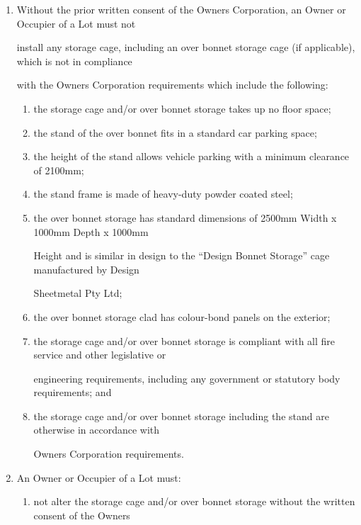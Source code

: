 \documentclass{article}
\begin{document}
\begin{enumerate}[label=\arabic*.]
\begin{enumerate}[label=\arabic{enumi}.\arabic*.]
\begin{enumerate}[label=(\arabic*)]
\item  Without the prior written consent of the Owners Corporation, an Owner or Occupier of a Lot must not 

install any storage cage, including an over bonnet storage cage (if applicable), which is not in compliance 

with the Owners Corporation requirements which include the following: 

\begin{enumerate}[label=(\alph*)]
\item  the storage cage and/or over bonnet storage takes up no floor space; 

\item  the stand of the over bonnet fits in a standard car parking space; 

\item  the height of the stand allows vehicle parking with a minimum clearance of 2100mm; 

\item  the stand frame is made of heavy-duty powder coated steel; 

\item  the over bonnet storage has standard dimensions of 2500mm Width x 1000mm Depth x 1000mm 

Height and is similar in design to the “Design Bonnet Storage” cage manufactured by Design 

Sheetmetal Pty Ltd; 

\item  the over bonnet storage clad has colour-bond panels on the exterior; 

\item  the storage cage and/or over bonnet storage is compliant with all fire service and other legislative or 

engineering requirements, including any government or statutory body requirements; and 

\item  the storage cage and/or over bonnet storage including the stand are otherwise in accordance with 

Owners Corporation requirements. 

\end{enumerate}
\item  An Owner or Occupier of a Lot must: 

\begin{enumerate}[label=(\alph*)]
\item  not alter the storage cage and/or over bonnet storage without the written consent of the Owners 


\end{enumerate}
\end{enumerate}
\end{enumerate}
\end{enumerate}
\end{document}

